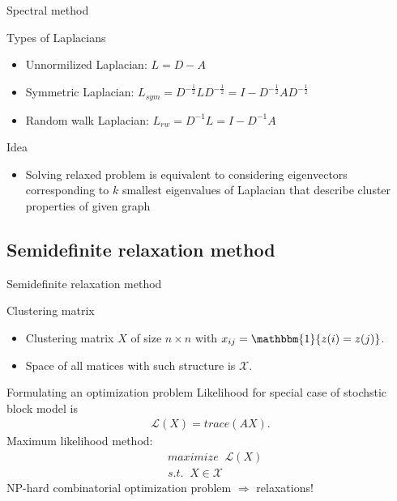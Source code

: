 \documentclass{beamer}
\theoremstyle{definition}
\theoremstyle{plain}
\theoremstyle{remark}
\begin{document}
		 	\begin{frame}{Spectral method}
				\begin{block}{Types of Laplacians}
					\begin{itemize}
						\item Unnormilized Laplacian: $L=D-A$
						\item Symmetric Laplacian: $L_{sym} =D^{-\frac{1}{2}}LD^{-\frac{1}{2}}=I-D^{-\frac{1}{2}}AD^{-\frac{1}{2}}$
						\item Random walk Laplacian: $L_{rw} =D^{-1}L=I-D^{-1}A$
					\end{itemize}
				\end{block}

				\begin{block}{Idea}
					\begin{itemize}
						\item Solving relaxed problem is equivalent to considering eigenvectors corresponding to $k$ smallest eigenvalues of Laplacian that describe cluster properties of given graph
					\end{itemize}
				\end{block}
				
			\end{frame}	
		
		\subsection{Semidefinite relaxation method}
			\begin{frame}{Semidefinite relaxation method}
				\begin{block}{Clustering matrix}
				\begin{itemize}
					\item Clustering matrix $X$ of size $n\times n$ with $x_{ij} = \mathbbm{1}\{ z(i) = z(j) \}$.\\
					\item Space of all matices with such structure is $\mathcal{X}$.
				\end{itemize}
				\end{block}
				
				\begin{block}{Formulating an optimization problem}
				Likelihood for special case of stochstic block model is 
				\begin{equation} 
					\begin{aligned}
						\mathcal{L}(X) = trace(AX).
					\nonumber
					\end{aligned}
				\end{equation}
				Maximum likelihood method:
				\begin{equation} 
					\begin{aligned}
						&maximize\;\;\mathcal{L}(X)\\
						&s.t. \;\;X \in \mathcal{X}
					\nonumber
					\end{aligned}
				\end{equation}
				NP-hard combinatorial optimization problem $\Rightarrow$ relaxations!
				\end{block}
			\end{frame}
\end{document}
